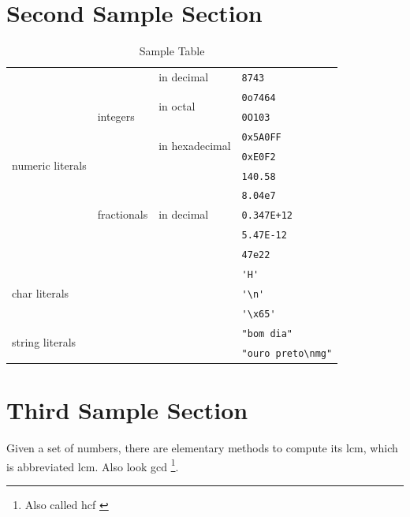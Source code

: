 \documentclass[twoside]{report}
\newcommand{\lp}[1]{\directlua{tex.print({#1})}}
\numberwithin{equation}{section}		%
\numberwithin{figure}{section}			%
\numberwithin{table}{section}
\begin{document}
    \section{Second Sample Section}
    \lipsum[1-3]

    \begin{table}
        \begin{center}
            \begin{tabular}{|l|l|l|l|}\hline
                \multirow{10}{*}{numeric literals} & \multirow{5}{*}{integers} & in decimal & \verb|8743| \\ \cline{3-4}
                & & \multirow{2}{*}{in octal} & \verb|0o7464| \\ \cline{4-4}
                & & & \verb|0O103| \\ \cline{3-4}
                & & \multirow{2}{*}{in hexadecimal} & \verb|0x5A0FF| \\ \cline{4-4}
                & & & \verb|0xE0F2| \\ \cline{2-4}
                & \multirow{5}{*}{fractionals} & \multirow{5}{*}{in decimal} & \verb|140.58| \\ \cline{4-4}
                & & & \verb|8.04e7| \\ \cline{4-4}
                & & & \verb|0.347E+12| \\ \cline{4-4}
                & & & \verb|5.47E-12| \\ \cline{4-4}
                & & & \verb|47e22| \\ \cline{1-4}
                \multicolumn{3}{|l|}{\multirow{3}{*}{char literals}} & \verb|'H'| \\ \cline{4-4}
                \multicolumn{3}{|l|}{} & \verb|'\n'| \\ \cline{4-4}          %
                \multicolumn{3}{|l|}{} & \verb|'\x65'| \\ \cline{1-4}        %
                \multicolumn{3}{|l|}{\multirow{2}{*}{string literals}} & \verb|"bom dia"| \\ \cline{4-4}
                \multicolumn{3}{|l|}{} & \verb|"ouro preto\nmg"| \\ \cline{1-4}          %
            \end{tabular}
            \caption{Sample Table}
        \end{center}
    \end{table}
    
    \section{Third Sample Section}
    Given a set of numbers, there are elementary methods to compute 
    its \acrlong{lcm}, which is abbreviated \gls{lcm}. Also look 
    \acrfull{gcd} \footnote{Also called \acrfull{hcf} \cite{einstein}}.
    \lipsum[4-5]

    \clearpage
    \printbibliography[title=\lp{references_title},heading=bibintoc]
\end{document}
